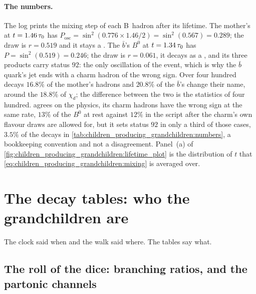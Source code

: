 \paragraph{The numbers.} The log prints the mixing step of each B~hadron
after its lifetime. The mother's \Bbar at $t=1.46\,\tau_0$ has
$P_{\mathrm{osc}}=\sin^2(0.776\times1.46/2)=\sin^2(0.567)=0.289$; the draw
is $r=0.519$ and it stays a \Bbar. The $\bar b$'s $B^0$ at $t=1.34\,\tau_0$
has $P=\sin^2(0.519)=0.246$; the draw is $r=0.061$, it decays as a \Bbar,
and its three products carry status $92$: the only oscillation of the
event, which is why the $\bar b$ quark's jet ends with a charm hadron of
the wrong sign. Over four hundred decays $16.8\%$ of the mother's hadrons
and $20.8\%$ of the $\bar b$'s change their name, around the $18.8\%$ of
$\chi_d$; the difference between the two is the statistics of four
hundred. \PYTHIA agrees on the physics, its charm hadrons have the wrong
sign at the same rate, $13\%$ of the $B^0$ at rest against $12\%$ in the
script after the charm's own flavour draws are allowed for, but it sets
status $92$ in only a third of those cases, $3.5\%$ of the decays in
\cref{tab:children_producing_grandchildren:numbers}, a bookkeeping
convention and not a disagreement. Panel~(a) of
\cref{fig:children_producing_grandchildren:lifetime_plot} is the
distribution of $t$ that \cref{eq:children_producing_grandchildren:mixing}
is averaged over.

\section{The decay tables: who the grandchildren are}
\label{sec:children_producing_grandchildren:decay_tables}

The clock said when and the walk said where. The tables say what.

\subsection{The roll of the dice: branching ratios, \texorpdfstring{}{onMode} and the partonic channels}
\label{sec:children_producing_grandchildren:tables}

